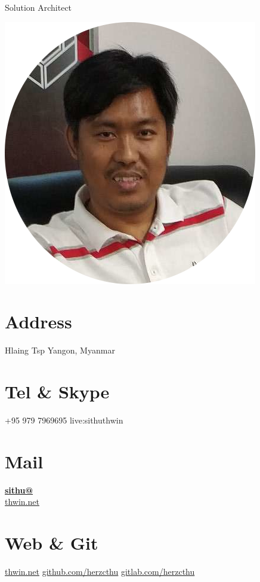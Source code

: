 \documentclass[]{friggeri-cv}
\begin{document}
      {Solution Architect}
      

\begin{aside}
  \includegraphics[scale=1]{img/myself-circle.png}
  \section{Address}
    Hlaing Tsp
    Yangon, Myanmar
    ~
  \section{Tel \& Skype}
    +95 979 7969695
    live:sithuthwin
    ~
  \section{Mail}
    \href{mailto:sithu@thwin.net}{\textbf{sithu@}\\thwin.net}
    ~
  \section{Web \& Git}
    \href{https://www.thwin.net}{thwin.net}
    \href{https://github.com/herzcthu}{github.com/herzcthu}
    \href{https://gitlab.com/herzcthu}{gitlab.com/herzcthu}
    ~

\end{aside}
\end{document}
